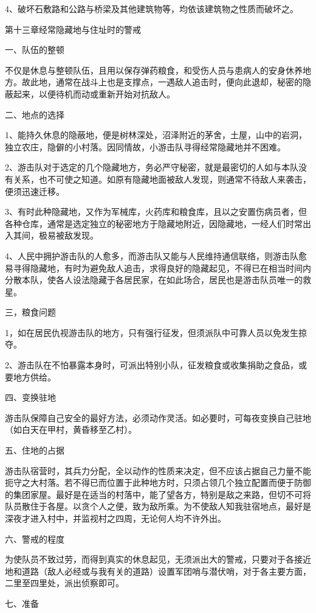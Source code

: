 4、破坏石敷路和公路与桥梁及其他建筑物等，均依该建筑物之性质而破坏之。

第十三章经常隐藏地与住址时的警戒

一、队伍的整顿

不仅是休息与整顿队伍，且用以保存弹药粮食，和受伤人员与患病人的安身休养地方。故此地，通常在战斗上也是支撑点，一遇敌人追击时，便向此退却，秘密的隐蔽起来，以便待机而动或重新开始对抗敌人。

二、地点的选择

1、能持久休息的隐蔽地，便是树林深处，沼泽附近的茅舍，土屋，山中的岩洞，独立农庄，隐僻的小村落。因同情故，小游击队寻得经常隐藏地并不困难。

2、游击队对于选定的几个隐藏地方，务必严守秘密，就是最密切的人如与本队没有关系，也不可使之知道。如原有隐藏地面被敌人发现，则通常不待敌人来袭击，便须迅速迁移。

3、有时此种隐藏地，又作为军械库，火药库和粮食库，且以之安置伤病员者，但各种仓库，通常是选定独立的秘密地方于隐藏地附近，因隐藏地，一经人们时常出入其间，极易被敌发现。

4、人民中拥护游击队的人愈多，而游击队又能与人民维持通信联络，则游击队愈易寻得隐藏地，有时为避免敌人追击，求得良好的隐藏起见，不得已在相当时间内分散本队，使各人设法隐藏于各居民家，在如此场合，居民也是游击队员唯一的救星。

三，粮食问题

1，如在居民仇视游击队的地方，只有强行征发，但须派队中可靠人员以免发生掠夺。

2、游击队在不怕暴露本身时，可派出特别小队，征发粮食或收集捐助之食品，或要地方供给。

四、变换驻地

游击队保障自己安全的最好方法，必须动作灵活。如必要时，可每夜变换自己驻地（如白天在甲村，黄昏移至乙村）。

五、住地的占据

游击队宿营时，其兵力分配，全以动作的性质来决定，但不应该占据自己力量不能扼守之大村落。若不得已而位置于此种地方时，只须占领几个独立配置而便于防御的集团家屋。最好是在适当的村落中，能了望各方，特别是敌之来路，但切不可将队员散住于各屋。以贪个人之便，致为敌所乘。为不使敌人知我驻宿地点，最好是深夜才进入村中，并监视村之四周，无论何人均不许外出。

六、警戒的程度

为使队员不致过劳，而得到真实的休息起见，无须派出大的警戒，只要对于各接近地和道路（敌人必经或与我有关的道路）设置军团哨与潜伏哨，对于各主要方面，二里至四里处，派出侦察即可。

七、准备

